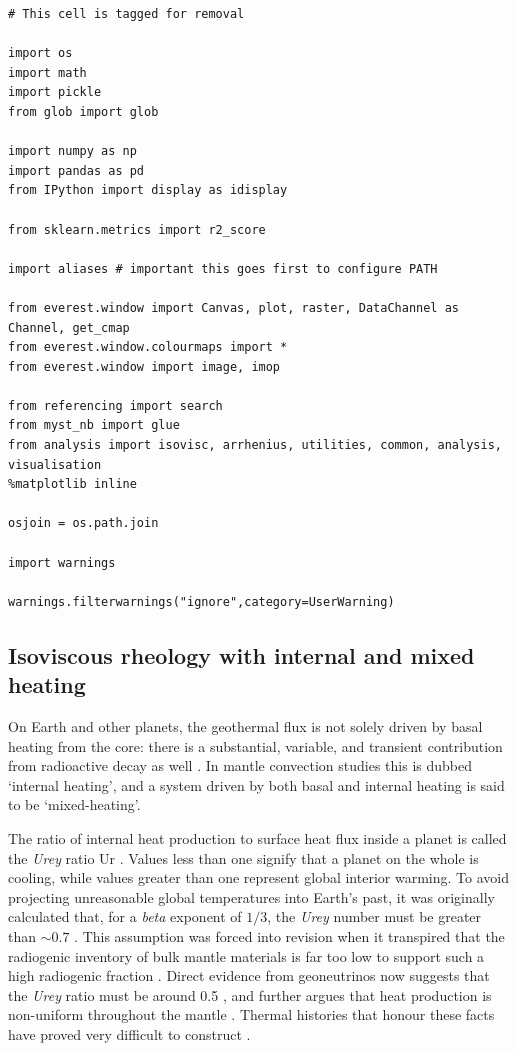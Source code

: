 \begin{verbatim}
# This cell is tagged for removal

import os
import math
import pickle
from glob import glob

import numpy as np
import pandas as pd
from IPython import display as idisplay

from sklearn.metrics import r2_score

import aliases # important this goes first to configure PATH

from everest.window import Canvas, plot, raster, DataChannel as Channel, get_cmap
from everest.window.colourmaps import *
from everest.window import image, imop

from referencing import search
from myst_nb import glue
from analysis import isovisc, arrhenius, utilities, common, analysis, visualisation
%matplotlib inline

osjoin = os.path.join

import warnings

warnings.filterwarnings("ignore",category=UserWarning)
\end{verbatim}

\subsection{Isoviscous rheology with internal and mixed heating}

On Earth and other planets, the geothermal flux is not solely driven by basal heating from the core: there is a substantial, variable, and transient contribution from radioactive decay as well \cite{Daly1980-xl}. In mantle convection studies this is dubbed `internal heating', and a system driven by both basal and internal heating is said to be `mixed-heating'.

The ratio of internal heat production to surface heat flux inside a planet is called the \textit{Urey} ratio $\mathrm{Ur}$  \cite{Urey1955-zs}. Values less than one signify that a planet on the whole is cooling, while values greater than one represent global interior warming. To avoid projecting unreasonable global temperatures into Earth's past, it was originally calculated that, for a \textit{beta} exponent of $1/3$, the \textit{Urey} number must be greater than $\sim0.7$ \cite{Christensen1985-bu}. This assumption was forced into revision when it transpired that the radiogenic inventory of bulk mantle materials is far too low to support such a high radiogenic fraction \cite{Jochum1983-dn}. Direct evidence from geoneutrinos now suggests that the \textit{Urey} ratio must be around 0.5 \cite{Gando2011-sh}, and further argues that heat production is non-uniform throughout the mantle \cite{Huang2013-eu}. Thermal histories that honour these facts have proved very difficult to construct \citet{Korenaga2003-oy, Korenaga2008-js, Mareschal2012-ie, Dye2012-cx, Jaupart2015-un, Korenaga2017-an}.

